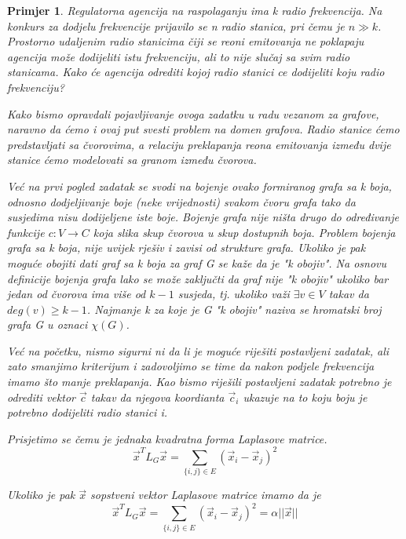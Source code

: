 \documentclass[11pt]{article}
\newtheorem{example}{Primjer}
\begin{document}
	\begin{example}
        Regulatorna agencija na raspolaganju ima k radio frekvencija. Na konkurs za dodjelu frekvencije prijavilo se n radio stanica, pri čemu je $n \gg k$.
        Prostorno udaljenim radio stanicima čiji se reoni emitovanja ne poklapaju agencija može dodijeliti istu frekvenciju, ali to nije slučaj sa svim radio stanicama.
        Kako će agencija odrediti kojoj radio stanici ce dodijeliti koju radio frekvenciju?

        Kako bismo opravdali pojavljivanje ovoga zadatku u radu vezanom za grafove, naravno da ćemo i ovaj put svesti problem na domen grafova.
        Radio stanice ćemo predstavljati sa čvorovima, a relaciju preklapanja reona emitovanja između dvije stanice ćemo modelovati sa granom između čvorova.

        Već na prvi pogled zadatak se svodi na bojenje ovako formiranog grafa sa k boja, odnosno dodjeljivanje boje (neke vrijednosti) svakom čvoru grafa tako da
        susjedima nisu dodijeljene iste boje.
		Bojenje grafa nije ništa drugo do određivanje funkcije $ c : V \to C$ koja slika skup čvorova u skup dostupnih boja.
        Problem bojenja grafa sa k boja, nije uvijek rješiv i zavisi od strukture grafa. Ukoliko je pak moguće obojiti dati graf sa k boja za graf G se kaže da je "k obojiv".
		Na osnovu definicije bojenja grafa lako se može zaključti da graf nije "k obojiv" ukoliko bar jedan od čvorova ima više od $k-1$ susjeda, tj. ukoliko važi $\exists v \in V$ takav da $deg(v) \geq k-1$. 
		Najmanje k za koje je G "k obojiv" naziva se hromatski broj grafa G u oznaci $\chi(G)$.

        Već na početku, nismo sigurni ni da li je moguće riješiti postavljeni zadatak, ali zato smanjimo kriterijum i zadovoljimo se time da nakon podjele frekvencija imamo što manje preklapanja.
        Kao bismo riješili postavljeni zadatak potrebno je odrediti vektor $\vec{c}$ takav da njegova koordianta $\vec{c}_i$ ukazuje na to koju boju je potrebno dodijeliti radio stanici i.

        Prisjetimo se čemu je jednaka kvadratna forma Laplasove matrice.
        \[
            \vec{x}^T L_G \vec{x} = \sum_{\{i,j\} \in E} (\vec{x}_i - \vec{x}_j)^2
        \]
        
        Ukoliko je pak $\vec{x}$ sopstveni vektor Laplasove matrice imamo da je 
        \[
            \vec{x}^T L_G \vec{x} = \sum_{\{i,j\} \in E} (\vec{x}_i - \vec{x}_j)^2 = \alpha ||\vec{x}||
        \]
        

\end{example}
\end{document}
